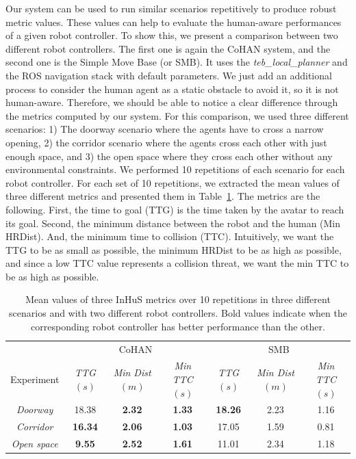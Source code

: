 Our system can be used to run similar scenarios repetitively to produce robust metric values. These values can help to evaluate the human-aware performances of a given robot controller. To show this, we present a comparison between two different robot controllers. The first one is again the CoHAN system, and the second one is the Simple Move Base (or SMB). It uses the \textit{teb\_local\_planner} and the ROS navigation stack with default parameters. We just add an additional process to consider the human agent as a static obstacle to avoid it, so it is not human-aware. Therefore, we should be able to notice a clear difference through the metrics computed by our system. For this comparison, we used three different scenarios: 1) The doorway scenario where the agents have to cross a narrow opening, 2) the corridor scenario where the agents cross each other with just enough space, and 3) the open space where they cross each other without any environmental constraints. We performed 10 repetitions of each scenario for each robot controller. For each set of 10 repetitions, we extracted the mean values of three different metrics and presented them in Table~\ref{tab:compare_robots}. The metrics are the following. First, the time to goal (TTG) is the time taken by the avatar to reach its goal. Second, the minimum distance between the robot and the human (Min HRDist). And, the minimum time to collision (TTC). Intuitively, we want the TTG to be as small as possible, the minimum HRDist to be as high as possible, and since a low TTC value represents a collision threat, we want the min TTC to be as high as possible. 

\begin{table}
\vspace{-0.2cm}
    \caption{Mean values of three InHuS metrics over 10 repetitions in three different scenarios and with two different robot controllers. Bold values indicate when the corresponding robot controller has better performance than the other.}
    \label{tab:compare_robots}
    \centering
    \begin{tabular}{|c|c|c|c|c|c|c|}
    \hline
     & \multicolumn{3}{c|}{CoHAN} & \multicolumn{3}{c|}{SMB}\\
    \cline{2-7}
    Experiment & \textit{TTG}$(s)$ & \textit{Min Dist}$(m)$&  \textit{Min TTC}$(s)$ 
    & \textit{TTG}$(s)$ & \textit{Min Dist}$(m)$ & \textit{Min TTC}$(s)$\\
    \hline
    \textit{Doorway} & 18.38 & \textbf{2.32} & \textbf{1.33} & \textbf{18.26} & 2.23 & 1.16\\
    \hline
    \textit{Corridor} & \textbf{16.34} & \textbf{2.06} & \textbf{1.03} & 17.05 & 1.59 & 0.81\\
    \hline
    \textit{Open space} & \textbf{9.55} & \textbf{2.52} & \textbf{1.61} & 11.01 & 2.34 & 1.18\\
    \hline
    \end{tabular}
\vspace{-0.3cm}  
\end{table}

